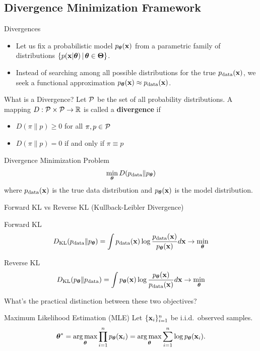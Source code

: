 \documentclass{beamer}
\renewcommand{\eqpause}{}
\begin{document}
\subsection{Divergence Minimization Framework}
\begin{frame}{Divergences}
	\begin{itemize}
	\item Let us fix a probabilistic model $p_{\boldsymbol{\theta}}(\mathbf{x})$ from a parametric family of distributions $\{p(\mathbf{x} | \boldsymbol{\theta}) \, | \, \boldsymbol{\theta} \in \boldsymbol{\Theta}\}$.\\
        \eqpause
	\item Instead of searching among all possible distributions for the true $p_{\text{data}}(\mathbf{x})$, we seek a functional approximation $p_{\boldsymbol{\theta}}(\mathbf{x}) \approx p_{\text{data}}(\mathbf{x})$.
	\end{itemize}
    \eqpause
	\begin{block}{What is a Divergence?}
		Let $\mathcal{P}$ be the set of all probability distributions. A mapping $D: \mathcal{P} \times \mathcal{P} \to \mathbb{R}$ is called a \textbf{divergence} if 
		\begin{itemize}
			\item $D(\pi \| p) \geq 0$ for all $\pi, p \in \mathcal{P}$
			\item $D(\pi \| p) = 0$ if and only if $\pi \equiv p$
		\end{itemize}
	\end{block}
    \eqpause
	\begin{block}{Divergence Minimization Problem}
		\vspace{-0.3cm}
		$$
		\min_{\boldsymbol{\theta}} D(p_{\text{data}} \| p_{\boldsymbol{\theta}})
		$$
		where $p_{\text{data}}(\mathbf{x})$ is the true data distribution and $p_{\boldsymbol{\theta}}(\mathbf{x})$ is the model distribution.
	\end{block}
\end{frame}
\begin{frame}{Forward KL vs Reverse KL (Kullback-Leibler Divergence)}
	\begin{block}{Forward KL}
		\vspace{-0.2cm}
		\[
			D_\mathrm{KL}(p_{\text{data}} \| p_{\boldsymbol{\theta}}) = \int p_{\text{data}}(\mathbf{x}) \log \frac{p_{\text{data}}(\mathbf{x})}{p_{\boldsymbol{\theta}}(\mathbf{x})} d \mathbf{x} \rightarrow \min_{\boldsymbol{\theta}}
		\]
	\end{block}
    \eqpause
	\begin{block}{Reverse KL}
		\vspace{-0.2cm}
		\[
			D_\mathrm{KL}(p_{\boldsymbol{\theta}} \| p_{\text{data}}) = \int p_{\boldsymbol{\theta}}(\mathbf{x}) \log \frac{p_{\boldsymbol{\theta}}(\mathbf{x})}{p_{\text{data}}(\mathbf{x})} d \mathbf{x} \rightarrow \min_{\boldsymbol{\theta}}
		\]
	\end{block}
    \eqpause
	What's the practical distinction between these two objectives?
    \eqpause
	\begin{block}{Maximum Likelihood Estimation (MLE)}
	Let $\{\mathbf{x}_i\}_{i=1}^n$ be i.i.d.\ observed samples.
		\vspace{-0.3cm}
		\[
			\boldsymbol{\theta}^* = \operatorname*{arg\,max}_{\boldsymbol{\theta}} \prod_{i=1}^n p_{\boldsymbol{\theta}}(\mathbf{x}_i) = \operatorname*{arg\,max}_{\boldsymbol{\theta}} \sum_{i=1}^n \log p_{\boldsymbol{\theta}}(\mathbf{x}_i).
		\]
	\end{block}
\end{frame}
\end{document}
